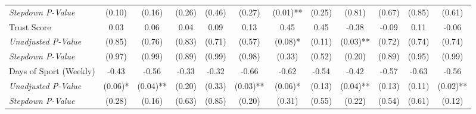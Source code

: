 \begin{tabular}{l c c c c c c c c c c c}
\quad \textit{Stepdown P-Value} & (0.10) & (0.16) & (0.26) & (0.46) & (0.27) & (0.01)** & (0.25) & (0.81) & (0.67) & (0.85) & (0.61) \\
Trust Score & 0.03 & 0.06 & 0.04 & 0.09 & 0.13 & 0.45 & 0.45 & -0.38 & -0.09 & 0.11 & -0.06 \\
\quad \textit{Unadjusted P-Value} & (0.85) & (0.76) & (0.83) & (0.71) & (0.57) & (0.08)* & (0.11) & (0.03)** & (0.72) & (0.74) & (0.74) \\
\quad \textit{Stepdown P-Value} & (0.97) & (0.99) & (0.89) & (0.99) & (0.98) & (0.33) & (0.52) & (0.20) & (0.89) & (0.95) & (0.99) \\
Days of Sport (Weekly) & -0.43 & -0.56 & -0.33 & -0.32 & -0.66 & -0.62 & -0.54 & -0.42 & -0.57 & -0.63 & -0.56 \\
\quad \textit{Unadjusted P-Value} & (0.06)* & (0.04)** & (0.20) & (0.33) & (0.03)** & (0.06)* & (0.13) & (0.04)** & (0.13) & (0.11) & (0.02)** \\
\quad \textit{Stepdown P-Value} & (0.28) & (0.16) & (0.63) & (0.85) & (0.20) & (0.31) & (0.55) & (0.22) & (0.54) & (0.61) & (0.12) \\
\bottomrule
\end{tabular}
